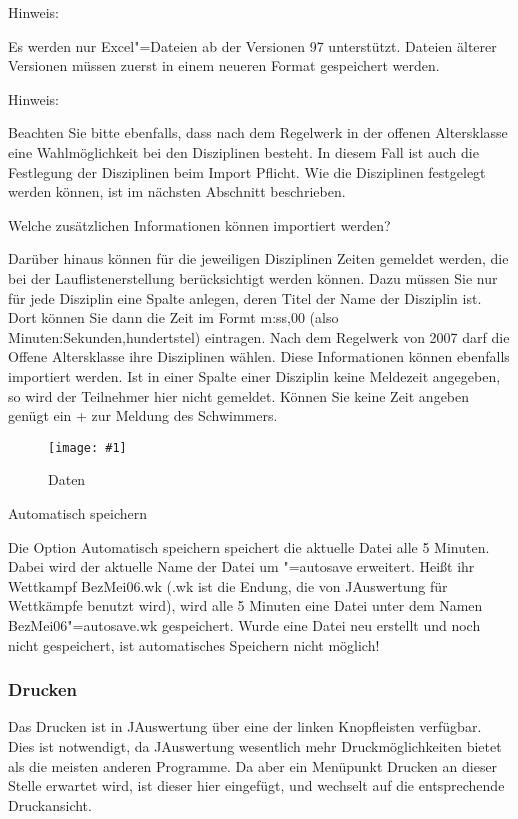 \documentclass[11pt,a4paper,twoside,ngerman]{article}
\newcommand{\hsmimage}[3]{\begin{figure}[!ht]\centering\texttt{[image: \#1]}\caption{#3}\end{figure}}
\begin{document}
\begin{bfseries}Hinweis:\end{bfseries} Es werden nur Excel"=Dateien ab der Versionen 97 unterstützt. Dateien älterer Versionen müssen zuerst in einem neueren Format gespeichert werden.

\begin{bfseries}Hinweis:\end{bfseries} Beachten Sie bitte ebenfalls, dass nach dem Regelwerk in der offenen Altersklasse eine Wahlmöglichkeit bei den Disziplinen besteht. In diesem Fall ist auch die Festlegung der Disziplinen beim Import Pflicht. Wie die Disziplinen festgelegt werden können, ist im nächsten Abschnitt beschrieben.

\begin{bfseries}Welche zusätzlichen Informationen können importiert werden?\end{bfseries} Darüber hinaus können für die jeweiligen Disziplinen Zeiten gemeldet werden, die bei der Lauflistenerstellung berücksichtigt werden können. Dazu müssen Sie nur für jede Disziplin eine Spalte anlegen, deren Titel der Name der Disziplin ist. Dort können Sie dann die Zeit im Formt \glqq{}m:ss,00\grqq{} (also Minuten:Sekunden,hundertstel) eintragen. Nach dem Regelwerk von 2007 darf die Offene Altersklasse ihre Disziplinen wählen. Diese Informationen können ebenfalls importiert werden. Ist in einer Spalte einer Disziplin keine Meldezeit angegeben, so wird der Teilnehmer hier nicht gemeldet. Können Sie keine Zeit angeben genügt ein \glqq{}+\grqq{} zur Meldung des Schwimmers.


\hsmimage{pics/exportieren-daten}{.50\textwidth}{Daten}
\begin{bfseries}Automatisch speichern\end{bfseries}

Die Option \glqq{}Automatisch speichern\grqq{} speichert die aktuelle Datei alle 5 Minuten. Dabei wird der aktuelle Name der Datei um \glqq{}"=autosave\grqq{} erweitert. Heißt ihr Wettkampf \glqq{}BezMei06.wk\grqq{} (\glqq{}.wk\grqq{} ist die Endung, die von JAuswertung für Wettkämpfe benutzt wird), wird alle 5 Minuten eine Datei unter dem Namen \glqq{}BezMei06"=autosave.wk\grqq{} gespeichert. Wurde eine Datei neu erstellt und noch nicht gespeichert, ist automatisches Speichern nicht möglich!


\subsubsection*{Drucken}
Das Drucken ist in JAuswertung über eine der linken Knopfleisten verfügbar. Dies ist notwendigt, da JAuswertung wesentlich mehr Druckmöglichkeiten bietet als die meisten anderen Programme. Da aber ein Menüpunkt \glqq{}Drucken\grqq{} an dieser Stelle erwartet wird, ist dieser hier eingefügt, und wechselt auf die entsprechende Druckansicht.
\end{document}
